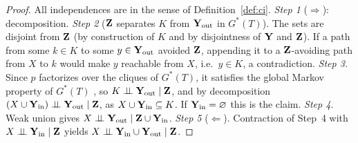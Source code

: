 \documentclass{article} %
\newcommand{\indep}{\perp\!\!\!\perp}
\begin{document}
\begin{proof}
All independences are in the sense of Definition~\ref{def:ci}.
\emph{Step 1} ($\Rightarrow$): decomposition.
\emph{Step 2} ($\mathbf{Z}$ separates $K$ from $\mathbf{Y}_{\mathrm{out}}$ in $G^\ast(T)$). The
sets are disjoint from $\mathbf{Z}$ (by construction of $K$ and by disjointness of $\mathbf{Y}$
and $\mathbf{Z}$). If a path from some $k\in K$ to some $y\in\mathbf{Y}_{\mathrm{out}}$ avoided
$\mathbf{Z}$, appending it to a $\mathbf{Z}$-avoiding path from $X$ to $k$ would make $y$
reachable from $X$, i.e.\ $y\in K$, a contradiction.
\emph{Step 3.} Since $p$ factorizes over the cliques of $G^\ast(T)$, it satisfies
the global Markov property of $G^\ast(T)$ \citep[Prop.~3.8]{lauritzen96}, so
$K\indep \bY_{\mathrm{out}}\mid \bZ$, and by decomposition
$(X\cup \bY_{\mathrm{in}})\indep \bY_{\mathrm{out}}\mid \bZ$, as
$X\cup\mathbf{Y}_{\mathrm{in}}\subseteq K$. If $\mathbf{Y}_{\mathrm{in}}=\varnothing$ this is the
claim.
\emph{Step 4.} Weak union gives $X\indep \bY_{\mathrm{out}}\mid \bZ\cup \bY_{\mathrm{in}}$.
\emph{Step 5} ($\Leftarrow$). Contraction of Step~4 with $X\indep \bY_{\mathrm{in}}\mid \bZ$
yields $X\indep \bY_{\mathrm{in}}\cup \bY_{\mathrm{out}}\mid \bZ$.
\end{proof}
\end{document}
